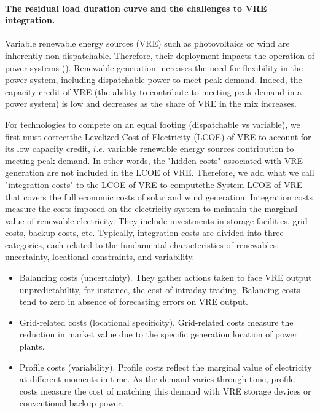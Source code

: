 \paragraph{The residual load duration curve and the challenges to VRE integration.}

Variable renewable energy sources (VRE) such as photovoltaics or wind are inherently non-dispatchable. Therefore, their deployment impacts the operation of power systems (\cite{Hirth2015}). Renewable generation increases the need for flexibility in the power system, including dispatchable power to meet peak demand. Indeed, the capacity credit of VRE (the ability to contribute to meeting peak demand in a power system) is low and decreases as the share of VRE in the mix increases.

For technologies to compete on an equal footing (dispatchable vs variable), we first must correctthe  Levelized Cost of Electricity (LCOE) of VRE to account for its low capacity credit, $i.e.$ variable renewable energy sources contribution to meeting peak demand. In other words, the "hidden costs" associated with VRE generation are not included in the LCOE of VRE. Therefore, we add what we call "integration costs" to the LCOE of VRE to computethe System LCOE of VRE that covers the full economic costs of solar and wind generation. Integration costs measure the costs imposed on the electricity system to maintain the marginal value of renewable electricity. They include investments in storage facilities, grid costs, backup costs, etc. Typically, integration costs are divided into three categories, each related to the fundamental characteristics of renewables: uncertainty, locational constraints, and variability.
\begin{itemize}
    \item Balancing costs (uncertainty). They gather actions taken to face VRE output unpredictability, for instance, the cost of intraday trading. Balancing costs tend to zero in absence of forecasting errors on VRE output.
    \item Grid-related costs (locational specificity). Grid-related costs measure the reduction in market value due to the specific generation location of power plants.
    \item Profile costs (variability). Profile costs reflect the marginal value of electricity at different moments in time. As the demand varies through time, profile costs measure the cost of matching this demand with VRE storage devices or conventional backup power.
\end{itemize}

